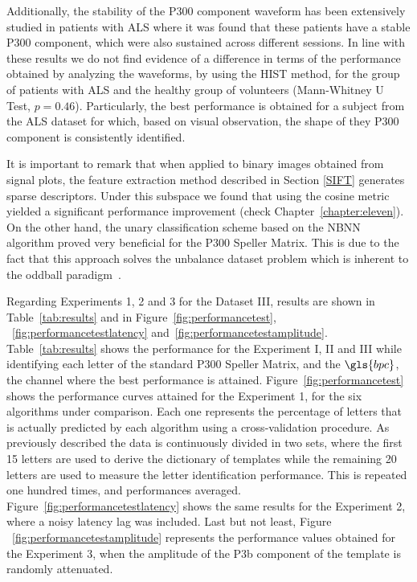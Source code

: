 Additionally, the stability of the P300 component waveform has been extensively studied in patients with ALS \cite{SellersandEmanuelDonchin2006,TomohiroMadarame2008,Nijboer2009,Mak2012,McCane2015} where it was found that these patients have a stable P300 component, which were also sustained across different sessions.  In line with these results we do not find evidence of a difference in terms of the performance obtained by analyzing the waveforms, by using the HIST method, for the group of patients with ALS and the healthy group of volunteers (Mann-Whitney U Test, $p=0.46$). Particularly, the best performance is obtained for a subject from the ALS dataset for which, based on visual observation, the shape of they P300 component is consistently identified.


It is important to remark that when applied to binary images obtained from signal plots, the feature extraction method described in Section \ref{SIFT} generates sparse descriptors.  Under this subspace we found that using the cosine metric yielded a significant performance improvement (check Chapter~\ref{chapter:eleven}). On the other hand, the unary classification scheme based on the NBNN algorithm proved very beneficial for the P300 Speller Matrix.  This is due to the fact that this approach solves the unbalance dataset problem which is inherent to the oddball paradigm~\cite{Tibon2015}.  



Regarding Experiments 1, 2 and 3 for the Dataset III, results are shown in Table~\ref{tab:results} and in Figure~\ref{fig:performancetest}, ~\ref{fig:performancetestlatency} and~\ref{fig:performancetestamplitude}.  Table~\ref{tab:results} shows the  performance for the Experiment I, II and III while identifying each letter of the standard P300 Speller Matrix, and the $\gls{bpc}$, the channel where the best performance is attained.   Figure~\ref{fig:performancetest} shows the performance curves attained for the Experiment 1, for the six algorithms under comparison.  Each one represents the percentage of letters that is actually predicted by each algorithm using a cross-validation procedure.  As previously described the data is continuously divided in two sets, where the first 15 letters are used to derive the dictionary of templates while the remaining 20 letters are used to measure the letter identification performance. This is repeated one hundred times, and performances averaged.   Figure~\ref{fig:performancetestlatency} shows the same results for the Experiment 2, where a noisy latency lag was included.   Last but not least, Figure ~\ref{fig:performancetestamplitude} represents the performance values obtained for the Experiment 3, when the amplitude of the P3b component of the template is randomly attenuated.  

